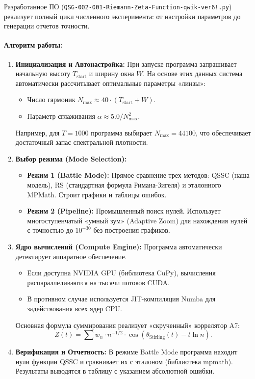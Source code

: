 \documentclass{article}
\numberwithin{equation}{section}
\theoremstyle{plain}
\theoremstyle{definition}
\theoremstyle{remark}
\def\theta{θ}\def\Theta{Θ}\def\pi{π}\def\Pi{Π}%
\def\alpha{α}\def\beta{β}\def\gamma{γ}\def\Gamma{Γ}%
\def\cdot{·}\def\times{×}\def\pm{±}\def\mp{∓}\def\approx{≈}%
\begin{document}
Разработанное ПО (\texttt{QSG-002-001-Riemann-Zeta-Function-qwik-ver6!.py}) реализует полный цикл численного эксперимента: от настройки параметров до генерации отчетов точности.

\paragraph{Алгоритм работы:}
\begin{enumerate}
    \item \textbf{Инициализация и Автонастройка:}
    При запуске программа запрашивает начальную высоту $T_{\text{start}}$ и ширину окна $W$. На основе этих данных система автоматически рассчитывает оптимальные параметры «линзы»:
    \begin{itemize}
        \item Число гармоник $N_{\text{max}} \approx 40 \cdot (T_{\text{start}} + W)$.
        \item Параметр сглаживания $\alpha \approx 5.0 / N_{\text{max}}^2$.
    \end{itemize}
    Например, для $T=1000$ программа выбирает $N_{\text{max}} = 44100$, что обеспечивает достаточный запас спектральной плотности.

    \item \textbf{Выбор режима (Mode Selection):}
    \begin{itemize}
        \item \textbf{Режим 1 (Battle Mode):} Прямое сравнение трех методов: QSSC (наша модель), RS (стандартная формула Римана-Зигеля) и эталонного MPMath. Строит графики и таблицы ошибок.
        \item \textbf{Режим 2 (Pipeline):} Промышленный поиск нулей. Использует многоступенчатый «умный зум» (Adaptive Zoom) для нахождения нулей с точностью до $10^{-30}$ без построения графиков.
    \end{itemize}

    \item \textbf{Ядро вычислений (Compute Engine):}
    Программа автоматически детектирует аппаратное обеспечение.
    \begin{itemize}
        \item Если доступна NVIDIA GPU (библиотека CuPy), вычисления распараллеливаются на тысячи потоков CUDA.
        \item В противном случае используется JIT-компиляция Numba для задействования всех ядер CPU.
    \end{itemize}
    Основная формула суммирования реализует «скрученный» коррелятор A7:
    \[ Z(t) = \sum w_n \cdot n^{-1/2} \cdot \cos(\theta_{\text{Stirling}}(t) - t \ln n). \]

    \item \textbf{Верификация и Отчетность:}
    В режиме Battle Mode программа находит нули функции QSSC и сравнивает их с эталоном (библиотека mpmath). Результаты выводятся в таблицу с указанием абсолютной ошибки.
\end{enumerate}
\end{document}
